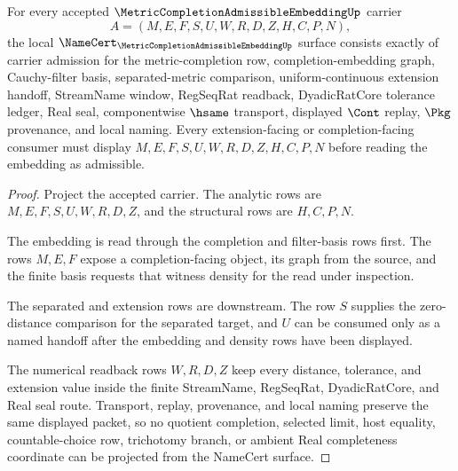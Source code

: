 \begin{theorem}
\label{thm:metric-completion-admissible-embedding-namecert-obligations}
For every accepted $\MetricCompletionAdmissibleEmbeddingUp$ carrier
$$
A=(M,E,F,S,U,W,R,D,Z,H,C,P,N),
$$
the local $\NameCert_{\MetricCompletionAdmissibleEmbeddingUp}$ surface consists exactly of carrier admission for the metric-completion row, completion-embedding graph, Cauchy-filter basis, separated-metric comparison, uniform-continuous extension handoff, StreamName window, RegSeqRat readback, DyadicRatCore tolerance ledger, Real seal, componentwise $\hsame$ transport, displayed $\Cont$ replay, $\Pkg$ provenance, and local naming. Every extension-facing or completion-facing consumer must display $M,E,F,S,U,W,R,D,Z,H,C,P,N$ before reading the embedding as admissible.
\end{theorem}
\begin{proof}
Project the accepted carrier. The analytic rows are $M,E,F,S,U,W,R,D,Z$, and the structural rows are $H,C,P,N$.

The embedding is read through the completion and filter-basis rows first. The rows $M,E,F$ expose a completion-facing object, its graph from the source, and the finite basis requests that witness density for the read under inspection.

The separated and extension rows are downstream. The row $S$ supplies the zero-distance comparison for the separated target, and $U$ can be consumed only as a named handoff after the embedding and density rows have been displayed.

The numerical readback rows $W,R,D,Z$ keep every distance, tolerance, and extension value inside the finite StreamName, RegSeqRat, DyadicRatCore, and Real seal route. Transport, replay, provenance, and local naming preserve the same displayed packet, so no quotient completion, selected limit, host equality, countable-choice row, trichotomy branch, or ambient Real completeness coordinate can be projected from the NameCert surface.
\end{proof}

